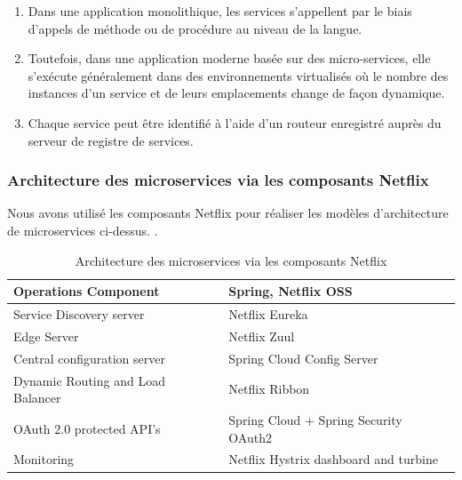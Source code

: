 \begin{itemize}
\begin{enumerate}
\item   Dans une application monolithique, les services s'appellent par le biais d'appels de méthode ou de procédure au niveau de la langue.

\item   Toutefois, dans une application moderne basée sur des micro-services, elle s'exécute généralement dans des environnements virtualisés où le nombre
des instances d'un service et de leurs emplacements change de façon dynamique.

\item   Chaque service peut être identifié à l'aide d'un routeur enregistré auprès du serveur de registre de services.
	
\end{enumerate}
\end{itemize}



\subsubsection{Architecture des microservices via les composants Netflix}
Nous avons utilisé les composants Netflix pour réaliser les modèles d’architecture de microservices ci-dessus. \parencite{MicroServices}.

\begin{table}[H]
	\begin{tabular}{|l|l|}
		\hline
	  \textbf{Operations Component}  & \textbf{Spring, Netflix OSS } \\ \hline
		Service Discovery server & Netflix Eureka \\ \hline
		Edge Server & Netflix Zuul \\ \hline
		Central configuration server & Spring Cloud Config Server \\ \hline
		Dynamic Routing and Load Balancer & Netflix Ribbon \\ \hline
		OAuth 2.0 protected API’s & Spring Cloud + Spring Security OAuth2 \\ \hline
		Monitoring & Netflix Hystrix dashboard and turbine \\ \hline
	\end{tabular}
 \label{fig:Netflix}
\caption{Architecture des microservices via les composants Netflix \parencite{MicroServices}}
\end{table}

